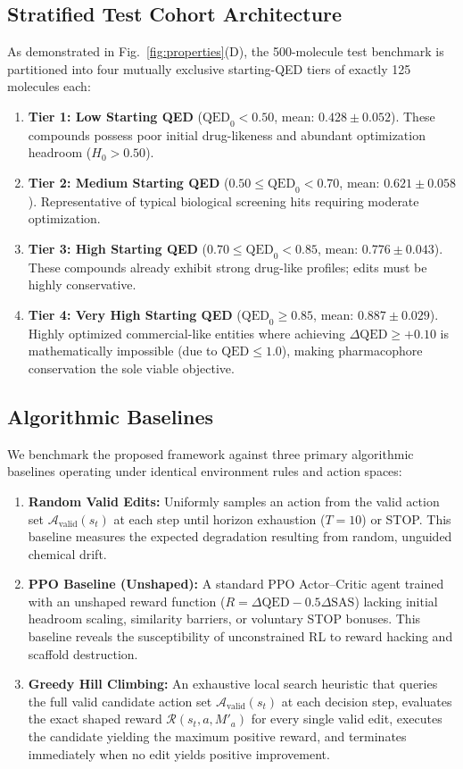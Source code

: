 \documentclass{ieeeaccess}
\begin{document}
\subsection{Stratified Test Cohort Architecture}
As demonstrated in Fig.~\ref{fig:properties}(D), the 500-molecule test benchmark is partitioned into four mutually exclusive starting-QED tiers of exactly 125 molecules each:
\begin{enumerate}
    \item \textbf{Tier 1: Low Starting QED} ($\text{QED}_0 < 0.50$, mean: $0.428 \pm 0.052$). These compounds possess poor initial drug-likeness and abundant optimization headroom ($H_0 > 0.50$).
    \item \textbf{Tier 2: Medium Starting QED} ($0.50 \le \text{QED}_0 < 0.70$, mean: $0.621 \pm 0.058$). Representative of typical biological screening hits requiring moderate optimization.
    \item \textbf{Tier 3: High Starting QED} ($0.70 \le \text{QED}_0 < 0.85$, mean: $0.776 \pm 0.043$). These compounds already exhibit strong drug-like profiles; edits must be highly conservative.
    \item \textbf{Tier 4: Very High Starting QED} ($\text{QED}_0 \ge 0.85$, mean: $0.887 \pm 0.029$). Highly optimized commercial-like entities where achieving $\Delta\text{QED} \ge +0.10$ is mathematically impossible (due to $\text{QED} \le 1.0$), making pharmacophore conservation the sole viable objective.
\end{enumerate}

\subsection{Algorithmic Baselines}
We benchmark the proposed framework against three primary algorithmic baselines operating under identical environment rules and action spaces:
\begin{enumerate}
    \item \textbf{Random Valid Edits:} Uniformly samples an action from the valid action set $\mathcal{A}_{\text{valid}}(s_t)$ at each step until horizon exhaustion ($T=10$) or STOP. This baseline measures the expected degradation resulting from random, unguided chemical drift.
    \item \textbf{PPO Baseline (Unshaped):} A standard PPO Actor--Critic agent trained with an unshaped reward function ($R = \Delta\text{QED} - 0.5\Delta\text{SAS}$) lacking initial headroom scaling, similarity barriers, or voluntary STOP bonuses. This baseline reveals the susceptibility of unconstrained RL to reward hacking and scaffold destruction.
    \item \textbf{Greedy Hill Climbing:} An exhaustive local search heuristic that queries the full valid candidate action set $\mathcal{A}_{\text{valid}}(s_t)$ at each decision step, evaluates the exact shaped reward $\mathcal{R}(s_t, a, M'_a)$ for every single valid edit, executes the candidate yielding the maximum positive reward, and terminates immediately when no edit yields positive improvement.
\end{enumerate}
\end{document}
